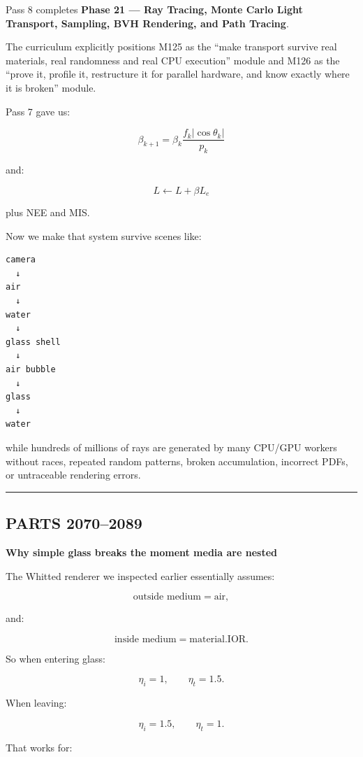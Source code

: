 Pass 8 completes \textbf{Phase 21 --- Ray Tracing, Monte Carlo Light Transport, Sampling, BVH Rendering, and Path Tracing}.

The curriculum explicitly positions M125 as the ``make transport survive real materials, real randomness and real CPU execution'' module and M126 as the ``prove it, profile it, restructure it for parallel hardware, and know exactly where it is broken'' module.

Pass 7 gave us:

\[
\beta_{k+1}
=
\beta_k
\frac{
f_k|\cos\theta_k|
}{
p_k
}
\]

and:

\[
L
\leftarrow
L+
\beta L_e
\]

plus NEE and MIS.

Now we make that system survive scenes like:

\begin{verbatim}
camera
  ↓
air
  ↓
water
  ↓
glass shell
  ↓
air bubble
  ↓
glass
  ↓
water
\end{verbatim}

while hundreds of millions of rays are generated by many CPU/GPU workers without races, repeated random patterns, broken accumulation, incorrect PDFs, or untraceable rendering errors.

\begin{center}\rule{0.5\linewidth}{0.5pt}\end{center}

\subsection{PARTS 2070--2089}\label{03-visual-computing-i-ch010-parts-20702089}

\hypertarget{03-visual-computing-i-ch010-parts-20702089}{}

\textbf{Why simple glass breaks the moment media are nested}

The Whitted renderer we inspected earlier essentially assumes:

\[
\text{outside medium}=\text{air},
\]

and:

\[
\text{inside medium}=\text{material.IOR}.
\]

So when entering glass:

\[
\eta_i=1,
\qquad
\eta_t=1.5.
\]

When leaving:

\[
\eta_i=1.5,
\qquad
\eta_t=1.
\]

That works for:


